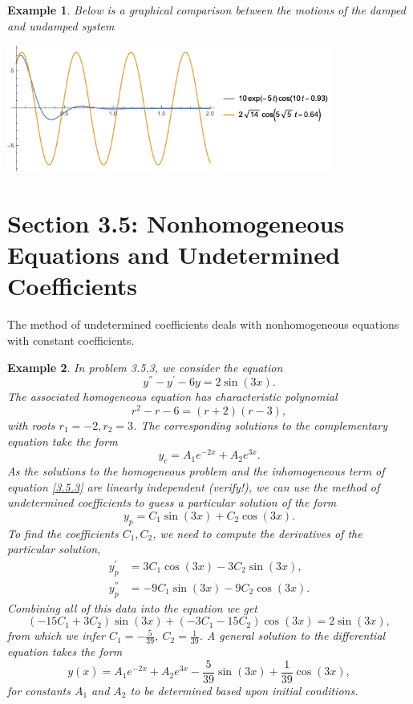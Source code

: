 \documentclass[11pt]{amsart}
\newtheorem{example}{Example}
\numberwithin{equation}{section}
\begin{document}
\begin{example}
Below is a graphical comparison between the motions of the damped and undamped system
\begin{center}
\includegraphics[width=0.8\textwidth]{p1.png}
\end{center}
\end{example}


\section*{Section 3.5: Nonhomogeneous Equations and Undetermined Coefficients}

The method of undetermined coefficients deals with nonhomogeneous equations with constant coefficients. 

\begin{example}
In problem 3.5.3, we consider the equation 
\begin{equation}\label{3.5.3}
y^{''}-y^{'}-6y=2\sin(3x).
\end{equation}
The associated homogeneous equation has characteristic polynomial
\begin{equation*}
r^2-r-6=(r+2)(r-3),
\end{equation*}
with roots $r_1=-2, r_2=3$. The corresponding solutions to the complementary equation take the form 
\begin{equation*}
y_c=A_1e^{-2x}+A_2e^{3x}.
\end{equation*}
As the solutions to the homogeneous problem and the inhomogeneous term of equation \eqref{3.5.3} are linearly independent (verify!), we can use the method of undetermined coefficients to guess a particular solution of the form 
\begin{equation*}
y_p=C_1\sin(3x)+C_2\cos(3x).
\end{equation*}
To find the coefficients $C_1,C_2$, we need to compute the derivatives of the particular solution, 
\begin{align*}
y_{p}^{'} & = 3C_1\cos(3x)-3C_2\sin(3x), \\
y_{p}^{''} & = -9C_1\sin(3x)-9C_2\cos(3x).
\end{align*}
Combining all of this data into the equation we get
\begin{equation*}
(-15C_1+3C_2)\sin(3x) + (-3C_1-15C_2)\cos(3x) = 2\sin(3x), 
\end{equation*}
from which we infer $C_1=-\frac{5}{39}$, $C_2=\frac{1}{39}$. A general solution to the differential equation takes the form
\begin{equation*}
y(x)=A_1e^{-2x}+A_2e^{3x}-\frac{5}{39}\sin(3x)+\frac{1}{39}\cos(3x),
\end{equation*}
for constants $A_1$ and $A_2$ to be determined based upon initial conditions. 
\end{example}
\end{document}
